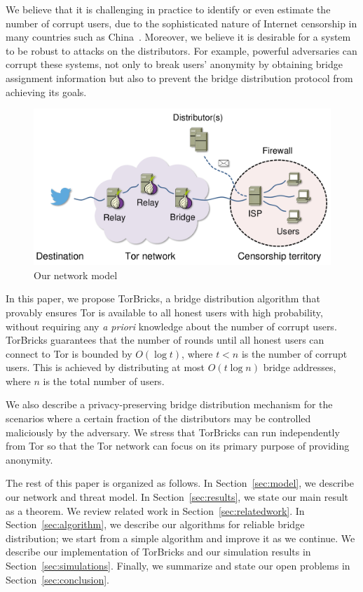 \documentclass{sig-alternate-05-2015}
\newcommand{\bricks}{}
\def\bricks/{\mbox{TorBricks}}
\begin{document}
We believe that it is challenging in practice to identify or even estimate the number of corrupt users, due to the sophisticated nature of Internet censorship in many countries such as China~\cite{Oni:2012:China,Ensafi2015b}. Moreover, we believe it is desirable for a system to be robust to attacks on the distributors. For example, powerful adversaries can corrupt these systems, not only to break users' anonymity by obtaining bridge assignment information but also to prevent the bridge distribution protocol from achieving its goals.%

\begin{figure}[t]
	\centering
	\includegraphics[width=0.6\linewidth]{images/model.pdf}
	\caption{Our network model}
	\label{fig:model}
\end{figure}

In this paper, we propose \bricks/, a bridge distribution algorithm that provably ensures Tor is available to all honest users with high probability, without requiring any \emph{a priori} knowledge about the number of corrupt users. \bricks/ guarantees that the number of rounds until all honest users can connect to Tor is bounded by $O(\log{t})$, where ${t<n}$ is the number of corrupt users. This is achieved by distributing at most $O(t\log{n})$ bridge addresses, where $n$ is the total number of users.

We also describe a privacy-preserving bridge distribution mechanism for the scenarios where a certain fraction of the distributors may be controlled maliciously by the adversary. 
We stress that \bricks/ can run independently from Tor so that the Tor network can focus on its primary purpose of providing anonymity.

The rest of this paper is organized as follows. In Section~\ref{sec:model}, we describe our network and threat model. In Section~\ref{sec:results}, we state our main result as a theorem. We review related work in Section~\ref{sec:relatedwork}. In Section~\ref{sec:algorithm}, we describe our algorithms for reliable bridge distribution; we start from a simple algorithm and improve it as we continue. We describe our implementation of \bricks/ and our simulation results in Section~\ref{sec:simulations}. Finally, we summarize and state our open problems in Section~\ref{sec:conclusion}.
\end{document}
